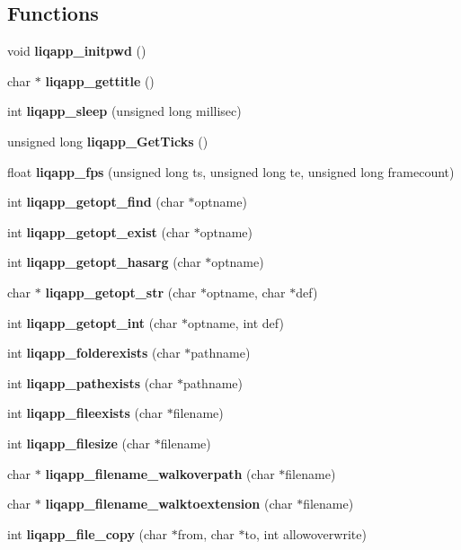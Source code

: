 \subsection*{Functions}
\begin{CompactItemize}
\item 
void \textbf{liqapp\_\-initpwd} ()\label{d7/dbc/liqapp_8c_265c933ab7b3fb1aa335c6306b6a842b}

\item 
char $\ast$ \textbf{liqapp\_\-gettitle} ()\label{d7/dbc/liqapp_8c_d14cf97bf83243840e5adc90f93865dc}

\item 
int {\bf liqapp\_\-sleep} (unsigned long millisec)
\item 
unsigned long {\bf liqapp\_\-GetTicks} ()
\item 
float {\bf liqapp\_\-fps} (unsigned long ts, unsigned long te, unsigned long framecount)
\item 
int \textbf{liqapp\_\-getopt\_\-find} (char $\ast$optname)\label{d7/dbc/liqapp_8c_043aebdfc3a22c8e06c33c63014b6f2c}

\item 
int \textbf{liqapp\_\-getopt\_\-exist} (char $\ast$optname)\label{d7/dbc/liqapp_8c_bf217c0be59933373ac5da5f4a1b87eb}

\item 
int \textbf{liqapp\_\-getopt\_\-hasarg} (char $\ast$optname)\label{d7/dbc/liqapp_8c_313cb5c2158e425c83a20df677386f5d}

\item 
char $\ast$ \textbf{liqapp\_\-getopt\_\-str} (char $\ast$optname, char $\ast$def)\label{d7/dbc/liqapp_8c_4039c5c262a528d3e9b411b84687a7fc}

\item 
int \textbf{liqapp\_\-getopt\_\-int} (char $\ast$optname, int def)\label{d7/dbc/liqapp_8c_5f0c16530f52b7aafdaad0e1475652e3}

\item 
int {\bf liqapp\_\-folderexists} (char $\ast$pathname)
\item 
int {\bf liqapp\_\-pathexists} (char $\ast$pathname)
\item 
int {\bf liqapp\_\-fileexists} (char $\ast$filename)
\item 
int {\bf liqapp\_\-filesize} (char $\ast$filename)
\item 
char $\ast$ {\bf liqapp\_\-filename\_\-walkoverpath} (char $\ast$filename)
\item 
char $\ast$ {\bf liqapp\_\-filename\_\-walktoextension} (char $\ast$filename)
\item 
int \textbf{liqapp\_\-file\_\-copy} (char $\ast$from, char $\ast$to, int allowoverwrite)\label{d7/dbc/liqapp_8c_7316b06f4ce296e3e6af9ca541f0df0e}


\end{CompactItemize}
